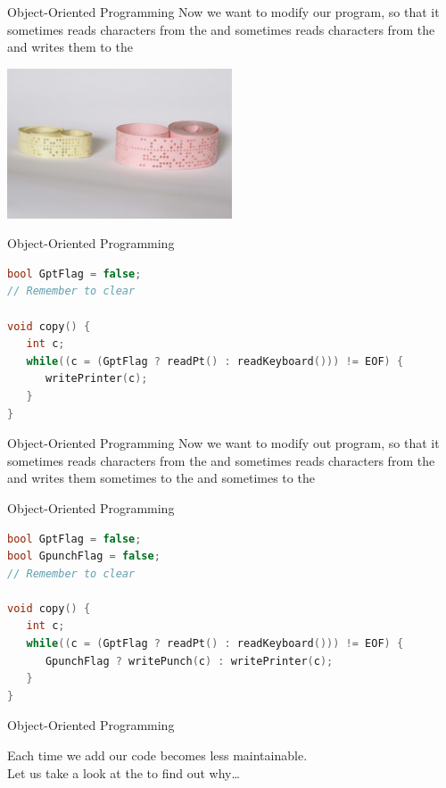 \begin{frame}{Object-Oriented Programming}
Now we want to modify our program, so that it sometimes reads characters
from the  and sometimes reads characters from the
 and writes them to the 
\begin{center}
\includegraphics[width=0.5\textwidth]{resources/PaperTapes.jpg}
\end{center}
\end{frame}

\begin{frame}[fragile]{Object-Oriented Programming}
\begin{lstlisting}[language=c]
bool GptFlag = false;
// Remember to clear

void copy() {
   int c;
   while((c = (GptFlag ? readPt() : readKeyboard())) != EOF) {
      writePrinter(c);
   }
}
\end{lstlisting}
\end{frame}

\begin{frame}{Object-Oriented Programming}
Now we want to modify out program, so that it sometimes reads characters
from the  and sometimes reads characters from the
 and writes them sometimes to the
 and sometimes to the 
\end{frame}

\begin{frame}[fragile]{Object-Oriented Programming}
\begin{lstlisting}[language=c]
bool GptFlag = false;
bool GpunchFlag = false;
// Remember to clear

void copy() {
   int c;
   while((c = (GptFlag ? readPt() : readKeyboard())) != EOF) {
      GpunchFlag ? writePunch(c) : writePrinter(c);
   }
}
\end{lstlisting}
\end{frame}

\begin{frame}{Object-Oriented Programming}
\begin{center}
Each time we add  our code becomes \alert{less
maintainable}.\\
Let us take a look at the  to find out why\ldots
\end{center}
\end{frame}

